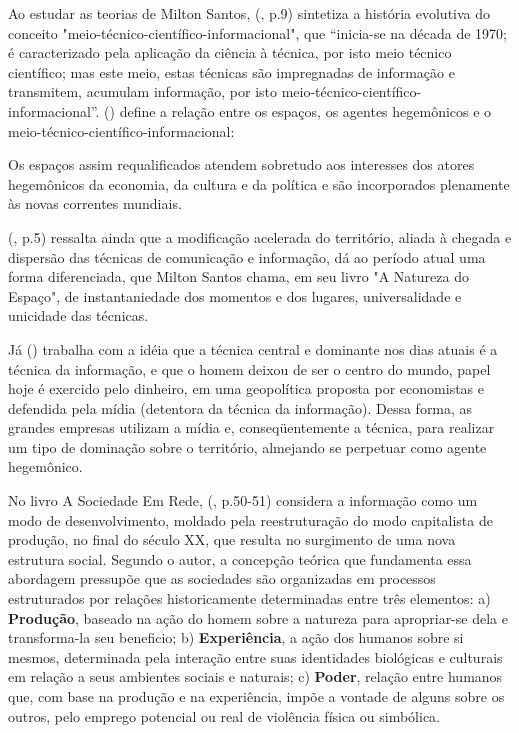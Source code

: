 Ao estudar as teorias de Milton Santos,  (\citeyear{maia}, p.9) sintetiza a história evolutiva do conceito "meio-técnico-científico-informacional", que “inicia-se na década de 1970; é caracterizado pela aplicação da ciência à técnica, por isto meio técnico científico; mas este meio, estas técnicas são impregnadas de informação e transmitem, acumulam informação, por isto meio-técnico-científico-informacional”.  (\citeyear{santos1996}) define a relação entre os espaços, os agentes hegemônicos e o meio-técnico-científico-informacional:

\begin{citacao}
Os espaços assim requalificados atendem sobretudo aos interesses dos atores hegemônicos da economia, da cultura e da política e são incorporados plenamente às novas correntes mundiais. \cite[p. 191]{santos1996}
\end{citacao}

 (\citeyear{maia}, p.5) ressalta ainda que a modificação acelerada do território, aliada à chegada e dispersão das técnicas de comunicação e informação, dá ao período atual uma forma diferenciada, que Milton Santos chama, em seu livro "A Natureza do Espaço", de instantaniedade dos momentos e dos lugares, universalidade e unicidade das técnicas.

Já  (\citeyear{santos2001}) trabalha com a idéia que a técnica central e dominante nos dias atuais é a técnica da informação, e que o homem deixou de ser o centro do mundo, papel hoje é exercido pelo dinheiro, em uma geopolítica proposta por economistas e defendida pela mídia (detentora da técnica da informação). Dessa forma, as grandes empresas utilizam a mídia e, conseqüentemente a técnica, para realizar um tipo de dominação sobre o território, almejando se perpetuar como agente hegemônico.


No livro A Sociedade Em Rede,   (\citeyear{castells1999}, p.50-51) considera a informação como um modo de desenvolvimento, moldado pela reestruturação do modo capitalista de produção, no final do século XX, que resulta no surgimento de uma nova estrutura social. Segundo o autor, a concepção teórica que fundamenta essa abordagem pressupõe que as sociedades são organizadas em processos estruturados por relações historicamente determinadas entre três elementos: a) \textbf{Produção}, baseado na ação do homem sobre a natureza para apropriar-se dela e transforma-la seu beneficio; b) \textbf{Experiência}, a ação dos humanos sobre si mesmos, determinada pela interação entre suas identidades biológicas e culturais em relação a seus ambientes sociais e naturais; c) \textbf{Poder}, relação entre humanos que, com base na produção e na experiência, impõe a vontade de alguns sobre os outros, pelo emprego potencial ou real de violência física ou simbólica.

